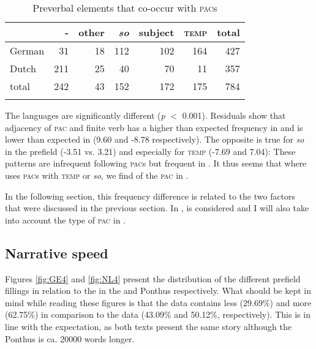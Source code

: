 \documentclass[output=paper,colorlinks,citecolor=brown]{langscibook}
\begin{document}
\begin{table}[ht]
\caption{Preverbal elements that co-occur with \textsc{pac}s}\label{tab-PVbig}
\begin{tabularx}{0.75\textwidth}{Xrrrrrr}
\lsptoprule
& {-} & {other}& {\textit{so}} & {subject} & {\textsc{temp}} & {total}\\
\midrule
German &31&18&112&102&164& 427 \\
Dutch &211&25&40&70&11& 357\\
\midrule
total &242&43&152&172&175& 784 \\
\lspbottomrule
\end{tabularx}
\end{table}

The languages are significantly different (\textit{p} $<$ 0.001). Residuals show that adjacency of \textsc{pac} and finite verb has a higher than expected frequency in  and is lower than expected in  (9.60 and -8.78 respectively). The opposite is true for \textit{so} in the prefield (-3.51 vs. 3.21) and especially for \textsc{temp} (-7.69 and 7.04): These patterns are infrequent following  \textsc{pac}s but frequent in . It thus seems that where  uses \textsc{pac}s with \textsc{temp} or \textit{so}, we find  of the \textsc{pac} in .

In the following section, this frequency difference is related to the two factors that were discussed in the previous section. In ,  is considered and I will also take into account the type of \textsc{pac} in .


\subsection{Narrative speed}\label{sec:5.1}
Figures \ref{fig:GE4} and \ref{fig:NL4} present the distribution of the different prefield fillings in relation to the  in the  and  Ponthus respectively. What should be kept in mind while reading these figures is that the  data contains less  (29.69\%) and more  (62.75\%) in comparison to the  data (43.09\% and 50.12\%, respectively). This is in line with the expectation, as both texts present the same story although the  Ponthus is ca. 20000 words longer.
\end{document}

